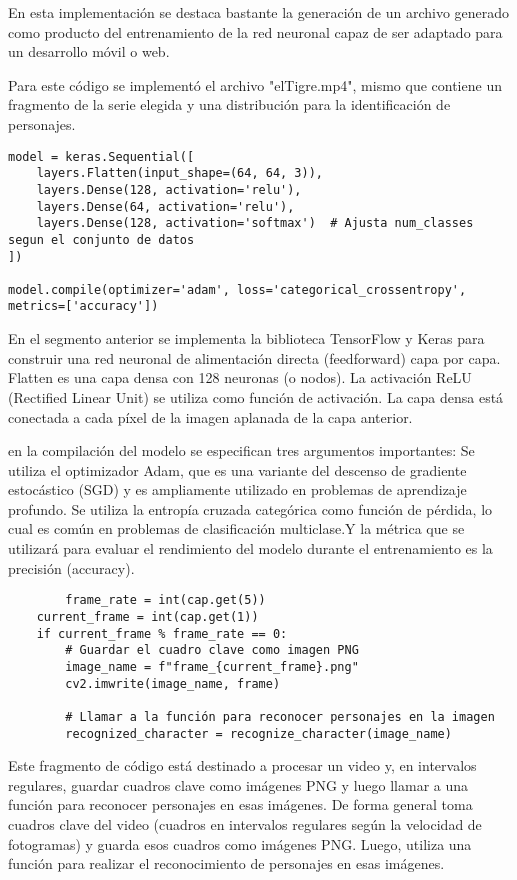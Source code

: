 \documentclass[a4paper,
               ]{jacow}
\begin{document}
En esta implementación se destaca bastante la generación de un archivo generado como producto del entrenamiento de la red neuronal capaz de ser adaptado para un desarrollo móvil o web.

Para este código se  implementó el archivo "elTigre.mp4", mismo que contiene un fragmento de la serie elegida y una distribución para la identificación de personajes.

\begin{lstlisting}
model = keras.Sequential([
    layers.Flatten(input_shape=(64, 64, 3)),
    layers.Dense(128, activation='relu'),
    layers.Dense(64, activation='relu'),
    layers.Dense(128, activation='softmax')  # Ajusta num_classes segun el conjunto de datos
])

model.compile(optimizer='adam', loss='categorical_crossentropy', metrics=['accuracy'])
\end{lstlisting}

En el segmento anterior se implementa la biblioteca TensorFlow y Keras para construir una red neuronal de alimentación directa (feedforward) capa por capa. Flatten es una capa densa con 128 neuronas (o nodos). La activación ReLU (Rectified Linear Unit) se utiliza como función de activación. La capa densa está conectada a cada píxel de la imagen aplanada de la capa anterior. 

en la compilación del modelo se especifican tres argumentos importantes: Se utiliza el optimizador Adam, que es una variante del descenso de gradiente estocástico (SGD) y es ampliamente utilizado en problemas de aprendizaje profundo. Se utiliza la entropía cruzada categórica como función de pérdida, lo cual es común en problemas de clasificación multiclase.Y la métrica que se utilizará para evaluar el rendimiento del modelo durante el entrenamiento es la precisión (accuracy).

\begin{lstlisting}
        frame_rate = int(cap.get(5))
    current_frame = int(cap.get(1))
    if current_frame % frame_rate == 0:
        # Guardar el cuadro clave como imagen PNG
        image_name = f"frame_{current_frame}.png"
        cv2.imwrite(image_name, frame)

        # Llamar a la función para reconocer personajes en la imagen
        recognized_character = recognize_character(image_name)
\end{lstlisting}

Este fragmento de código está destinado a procesar un video y, en intervalos regulares, guardar cuadros clave como imágenes PNG y luego llamar a una función para reconocer personajes en esas imágenes. De forma general toma cuadros clave del video (cuadros en intervalos regulares según la velocidad de fotogramas) y guarda esos cuadros como imágenes PNG. Luego, utiliza una función  para realizar el reconocimiento de personajes en esas imágenes.
\end{document}
